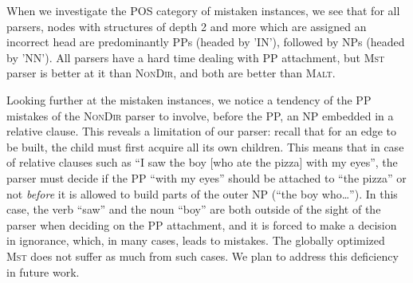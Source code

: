 \documentclass[11pt]{article}
\begin{document}

When we investigate the POS category of mistaken instances, we see that for all parsers, nodes with structures of depth 2 and more which are assigned an incorrect head are predominantly PPs (headed by 'IN'), followed by NPs (headed by 'NN').  All parsers have a hard time dealing with PP attachment, but \textsc{Mst} parser is better at it than \textsc{NonDir}, and both are better than \textsc{Malt}.  

Looking further at the mistaken instances, we notice a tendency of the PP mistakes of the \textsc{NonDir} parser to involve, before the PP, an NP embedded in a relative clause.  This reveals a limitation of our parser: recall that for an edge to be built, the child must first acquire all its own children.  This means that in case of relative clauses such as ``I saw the boy [who ate the pizza] with my eyes'', the parser must decide if the PP ``with my eyes'' should be attached to ``the pizza'' or not \textit{before} it is allowed to build parts of the outer NP (``the boy who\ldots'').  In this case, the verb ``saw'' and the noun ``boy'' are both outside of the sight of the parser when deciding on the PP attachment, and it is forced to make a decision in ignorance, which, in many cases, leads to mistakes.  The globally optimized \textsc{Mst} does not suffer as much from such cases.  We plan to address this deficiency in future work.
\end{document}
